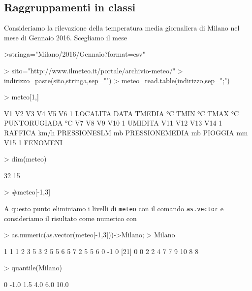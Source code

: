\documentclass[onecolumn,12pt]{book}
\begin{document}
\subsection{Raggruppamenti in classi}
Consideriamo la rilevazione della temperatura media giornaliera di Milano nel mese di Gennaio 2016.
Scegliamo il mese
\begin{Schunk}
\begin{Soutput}
>stringa="Milano/2016/Gennaio?format=csv"
\end{Soutput}
\end{Schunk}
\begin{Schunk}
\begin{Sinput}
> sito="http://www.ilmeteo.it/portale/archivio-meteo/"
> indirizzo=paste(sito,stringa,sep="")
> meteo=read.table(indirizzo,sep=";")
\end{Sinput}
\end{Schunk}
\begin{Schunk}
\begin{Sinput}
> meteo[1,]
\end{Sinput}
\begin{Soutput}
        V1   V2        V3      V4      V5              V6
1 LOCALITA DATA TMEDIA °C TMIN °C TMAX °C PUNTORUGIADA °C
         V7            V8              V9           V10
1 UMIDITA %
           V11             V12               V13        V14
1 RAFFICA km/h PRESSIONESLM mb PRESSIONEMEDIA mb PIOGGIA mm
       V15
1 FENOMENI
\end{Soutput}
\begin{Sinput}
> dim(meteo)
\end{Sinput}
\begin{Soutput}
[1] 32 15
\end{Soutput}
\begin{Sinput}
> #meteo[-1,3]
\end{Sinput}
\end{Schunk}
A questo punto eliminiamo i livelli di \texttt{meteo} con il comando \texttt{as.vector} e consideriamo il risultato come numerico con
\begin{Schunk}
\begin{Sinput}
> as.numeric(as.vector(meteo[-1,3]))->Milano;
> Milano
\end{Sinput}
\begin{Soutput}
 [1]  1  1  1  2  3  5  3  2  5  5  6  5  7  2  5  5  6  0 -1  0
[21]  0  0  2  2  4  7  7  9 10  8  8
\end{Soutput}
\begin{Sinput}
> quantile(Milano)
\end{Sinput}
\begin{Soutput}
  0%
-1.0  1.5  4.0  6.0 10.0 
\end{Soutput}
\end{Schunk}
\end{document}
